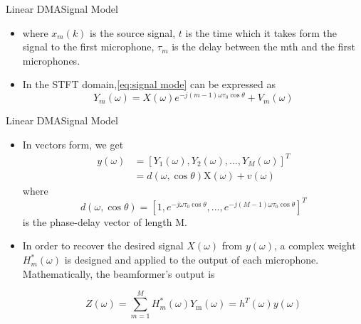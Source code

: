 \documentclass{beamer}
\begin{document}
\begin{frame}{Linear DMA}{Signal Model}
\begin{itemize}
\item
where ${{x}_{m}}(k)$ is the source signal, $ t $ is the time which it takes form the signal to  the first microphone, ${{\tau }_{m}}$ is the  delay between the mth and the first microphones. \cite{6}
\item
In the STFT domain,\eqref{eq:signal mode} can be expressed as
\begin{equation}
 {{Y}_{m}}(\omega )=X(\omega ){{e}^{-j(m-1)\omega {{\tau }_{0}}\cos \theta }}+{{V}_{m}}(\omega )
\end{equation}

\end{itemize}	
\end{frame}


\begin{frame}{Linear DMA}{Signal Model}
\begin{itemize}
\item{
In vectors form, we get
\begin{align}
  y(\omega )&={{\left[ {{Y}_{1}}(\omega ),{{Y}_{2}}(\omega ),...,{{Y}_{M}}(\omega ) \right]}^{T}} \\ 
 & =d(\omega ,\cos \theta )\text{X}(\omega )+v(\omega )  
\end{align}
where
\begin{equation}
d(\omega ,\cos \theta )={{\left[ 1,{{e}^{-j\omega {{\tau }_{0}}\cos \theta }},...,{{e}^{-j(M-1)\omega {{\tau }_{0}}\cos \theta }} \right]}^{T}}
\end{equation}
is the phase-delay vector of length M.
}
\item{
In order to recover the desired signal $X(\omega )  $ from $ y(\omega ) $, a complex weight $ H_m^* (\omega )  $ is designed and applied to the output of each microphone. Mathematically, the beamformer’s output is

\begin{equation}
Z(\omega )=\sum\limits_{m=1}^{M}{H_{m}^{*}(\omega ){{Y}_{\text{m}}}(\omega )}={{h}^{T}}(\omega )y(\omega )
\end{equation}

}
\end{itemize}
	
\end{frame}
\end{document}
